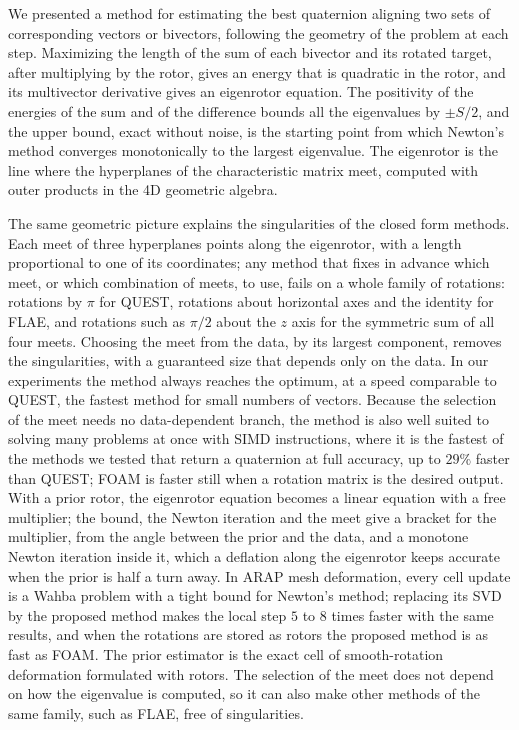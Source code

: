 \documentclass{birkjour}
\theoremstyle{definition}
\theoremstyle{remark}
\numberwithin{equation}{section}
\begin{document}
We presented a method for estimating the best quaternion aligning two sets of corresponding vectors or bivectors, following the geometry of the problem at each step. Maximizing the length of the sum of each bivector and its rotated target, after multiplying by the rotor, gives an energy that is quadratic in the rotor, and its multivector derivative gives an eigenrotor equation. The positivity of the energies of the sum and of the difference bounds all the eigenvalues by $\pm S/2$, and the upper bound, exact without noise, is the starting point from which Newton's method converges monotonically to the largest eigenvalue. The eigenrotor is the line where the hyperplanes of the characteristic matrix meet, computed with outer products in the 4D geometric algebra.

The same geometric picture explains the singularities of the closed form methods. Each meet of three hyperplanes points along the eigenrotor, with a length proportional to one of its coordinates; any method that fixes in advance which meet, or which combination of meets, to use, fails on a whole family of rotations: rotations by $\pi$ for QUEST, rotations about horizontal axes and the identity for FLAE, and rotations such as $\pi/2$ about the $z$ axis for the symmetric sum of all four meets. Choosing the meet from the data, by its largest component, removes the singularities, with a guaranteed size that depends only on the data. In our experiments the method always reaches the optimum, at a speed comparable to QUEST, the fastest method for small numbers of vectors. Because the selection of the meet needs no data-dependent branch, the method is also well suited to solving many problems at once with SIMD instructions, where it is the fastest of the methods we tested that return a quaternion at full accuracy, up to $29\%$ faster than QUEST; FOAM is faster still when a rotation matrix is the desired output. With a prior rotor, the eigenrotor equation becomes a linear equation with a free multiplier; the bound, the Newton iteration and the meet give a bracket for the multiplier, from the angle between the prior and the data, and a monotone Newton iteration inside it, which a deflation along the eigenrotor keeps accurate when the prior is half a turn away. In ARAP mesh deformation, every cell update is a Wahba problem with a tight bound for Newton's method; replacing its SVD by the proposed method makes the local step $5$ to $8$ times faster with the same results, and when the rotations are stored as rotors the proposed method is as fast as FOAM. The prior estimator is the exact cell of smooth-rotation deformation formulated with rotors. The selection of the meet does not depend on how the eigenvalue is computed, so it can also make other methods of the same family, such as FLAE, free of singularities.



\end{document}
